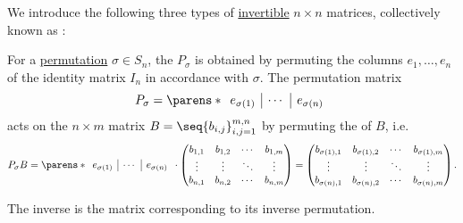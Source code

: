 \begin{definition}\label{def:elementary_matrix}
  We introduce the following three types of \hyperref[def:inverse_matrix]{invertible} \( n \times n \) matrices, collectively known as :
  \begin{thmenum}
     For a \hyperref[def:symmetric_group/permutation]{permutation} \( \sigma \in S_n \), the  \( P_\sigma \) is obtained by permuting the columns \( e_1, \ldots, e_n \) of the identity matrix \( I_n \) in accordance with \( \sigma \). The permutation matrix
    \begin{equation*}
      P_\sigma = \parens*
      {
        \begin{array}{c|c|c}
          e_{\sigma(1)} & \cdots & e_{\sigma(n)}
        \end{array}
      }
    \end{equation*}
    acts on the \( n \times m \) matrix \( B = \seq{ b_{i,j} }_{i,j=1}^{m,n} \) by permuting the  of \( B \), i.e.
    \begin{equation*}
      P_\sigma B
      =
      \parens*
      {
        \begin{array}{c|c|c}
          e_{\sigma(1)} & \cdots & e_{\sigma(n)}
        \end{array}
      }
      \cdot
      \begin{pmatrix}
        b_{1,1} & b_{1,2} & \cdots & b_{1,m} \\
        \vdots  & \vdots  & \ddots & \vdots \\
        b_{n,1} & b_{n,2} & \cdots & b_{n,m}
      \end{pmatrix}
      =
      \begin{pmatrix}
        b_{\sigma(1),1} & b_{\sigma(1),2} & \cdots & b_{\sigma(1),m} \\
        \vdots          & \vdots          & \ddots & \vdots \\
        b_{\sigma(n),1} & b_{\sigma(n),2} & \cdots & b_{\sigma(n),m}
      \end{pmatrix}.
    \end{equation*}

    The inverse is the matrix corresponding to its inverse permutation.


\end{thmenum}
\end{definition}
